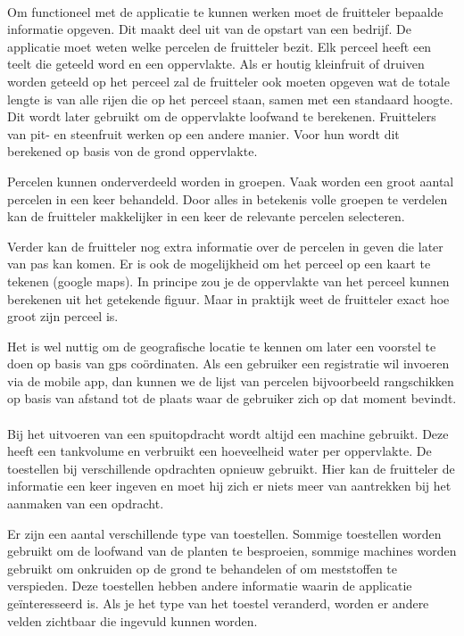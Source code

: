 \paragraph {} Om functioneel met de applicatie te kunnen werken moet de fruitteler bepaalde
informatie opgeven. Dit maakt deel uit van de opstart van een bedrijf.
De applicatie moet weten welke percelen de fruitteler bezit.
Elk perceel heeft een teelt die geteeld word en een oppervlakte. Als er houtig
kleinfruit of druiven worden geteeld op het perceel zal de fruitteler ook moeten opgeven wat de
totale lengte is van alle rijen die op het perceel staan, samen met een standaard hoogte.
Dit wordt later gebruikt om de oppervlakte loofwand te berekenen. Fruittelers van pit- en
steenfruit werken op een andere manier. Voor hun wordt dit berekened op basis von de
grond oppervlakte.

Percelen kunnen onderverdeeld worden in groepen. Vaak worden een groot aantal percelen in
een keer behandeld. Door alles in betekenis volle groepen te verdelen kan de fruitteler
makkelijker in een keer de relevante percelen selecteren.

Verder kan de fruitteler nog extra informatie over de percelen in geven die later van pas
kan komen. Er is ook de mogelijkheid om het perceel op een kaart te tekenen (google maps).
In principe zou je de oppervlakte van het perceel kunnen berekenen uit het getekende
figuur. Maar in praktijk weet de fruitteler exact hoe groot zijn perceel is.

Het is wel nuttig om de geografische locatie te kennen om later een voorstel te doen op
basis van gps co\"ordinaten. Als een gebruiker een registratie wil invoeren via de mobile
app, dan kunnen we de lijst van percelen bijvoorbeeld rangschikken op basis van afstand
tot de plaats waar de gebruiker zich op dat moment bevindt.

\paragraph {} Bij het uitvoeren van een spuitopdracht wordt altijd een machine gebruikt.
Deze heeft een tankvolume en verbruikt een hoeveelheid water per oppervlakte. De
toestellen bij verschillende opdrachten opnieuw gebruikt. Hier kan de fruitteler de
informatie een keer ingeven en moet hij zich er niets meer van aantrekken bij het aanmaken
van een opdracht.

Er zijn een aantal verschillende type van toestellen. Sommige toestellen worden gebruikt
om de loofwand van de planten te besproeien, sommige machines worden gebruikt om onkruiden
op de grond te behandelen of om meststoffen te verspieden. Deze toestellen hebben andere
informatie waarin de applicatie ge\"interesseerd is. Als je het type van het toestel
veranderd, worden er andere velden zichtbaar die ingevuld kunnen worden.

